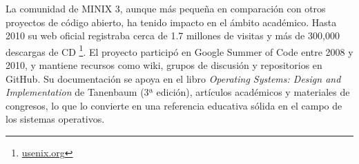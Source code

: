 La comunidad de MINIX 3, aunque más pequeña en comparación con otros proyectos de código abierto, ha tenido impacto en el ámbito académico. Hasta 2010 su web oficial registraba cerca de 1.7 millones de visitas y más de 300,000 descargas de CD \footnote{\url{usenix.org}}. El proyecto participó en Google Summer of Code entre 2008 y 2010, y mantiene recursos como wiki, grupos de discusión y repositorios en GitHub. Su documentación se apoya en el libro \textit{Operating Systems: Design and Implementation} de Tanenbaum (3ª edición), artículos académicos y materiales de congresos, lo que lo convierte en una referencia educativa sólida en el campo de los sistemas operativos.  
